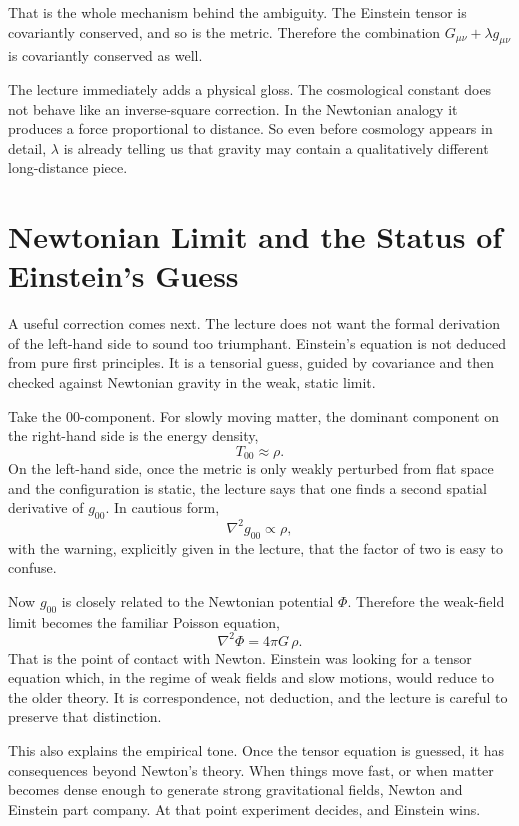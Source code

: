 That is the whole mechanism behind the ambiguity. The Einstein tensor is covariantly conserved, and so is the metric. Therefore the combination \(G_{\mu\nu}+\lambda g_{\mu\nu}\) is covariantly conserved as well.

The lecture immediately adds a physical gloss. The cosmological constant does not behave like an inverse-square correction. In the Newtonian analogy it produces a force proportional to distance. So even before cosmology appears in detail, \(\lambda\) is already telling us that gravity may contain a qualitatively different long-distance piece.

\section{Newtonian Limit and the Status of Einstein's Guess}

A useful correction comes next. The lecture does not want the formal derivation of the left-hand side to sound too triumphant. Einstein's equation is not deduced from pure first principles. It is a tensorial guess, guided by covariance and then checked against Newtonian gravity in the weak, static limit.

Take the \(00\)-component. For slowly moving matter, the dominant component on the right-hand side is the energy density,
\begin{equation}
T_{00}\approx \rho.
\end{equation}
On the left-hand side, once the metric is only weakly perturbed from flat space and the configuration is static, the lecture says that one finds a second spatial derivative of \(g_{00}\). In cautious form,
\begin{equation}
\nabla^2 g_{00}\propto \rho,
\end{equation}
with the warning, explicitly given in the lecture, that the factor of two is easy to confuse.

Now \(g_{00}\) is closely related to the Newtonian potential \(\Phi\). Therefore the weak-field limit becomes the familiar Poisson equation,
\begin{equation}
\nabla^2 \Phi = 4\pi G\,\rho.
\end{equation}
That is the point of contact with Newton. Einstein was looking for a tensor equation which, in the regime of weak fields and slow motions, would reduce to the older theory. It is correspondence, not deduction, and the lecture is careful to preserve that distinction.

This also explains the empirical tone. Once the tensor equation is guessed, it has consequences beyond Newton's theory. When things move fast, or when matter becomes dense enough to generate strong gravitational fields, Newton and Einstein part company. At that point experiment decides, and Einstein wins.

